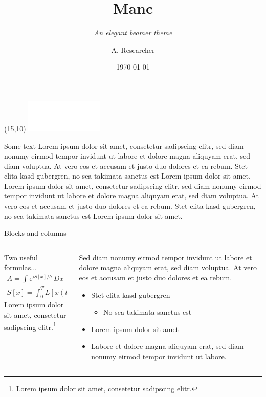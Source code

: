\documentclass[compress,aspectratio=1610]{beamer}
\title{Manc}
\subtitle{\textit{An elegant beamer theme}}
\date{\today}
\author{A. Researcher}
\institute{\texttt{mymail@myuniversity.edu}}
\begin{document}
\begin{frame}
  \titlepage
  \begin{textblock}{1}(15,10)
    \includegraphics[width=10em]{./graphics/manchester.pdf}
  \end{textblock}
\end{frame}

\begin{frame}{Some text}
	Lorem ipsum dolor sit amet, consetetur sadipscing elitr, sed diam nonumy eirmod tempor invidunt ut labore et dolore magna aliquyam erat, sed diam voluptua. At vero eos et accusam et justo duo dolores et ea rebum. Stet clita kasd gubergren, no sea takimata sanctus est Lorem ipsum dolor sit amet. Lorem  ipsum dolor sit amet, consetetur sadipscing elitr, sed diam nonumy eirmod tempor invidunt ut labore et dolore magna aliquyam erat, sed diam voluptua. At vero eos et accusam et justo duo dolores et ea rebum. Stet clita kasd gubergren, no sea takimata sanctus est Lorem ipsum dolor sit amet.
\end{frame}

\begin{frame}{Blocks and columns}
  \begin{columns}
    \begin{column}{0.5\textwidth}
      \begin{block}{Two useful formulas...}
        \begin{gather*}
          A = \int^{}\mathrm{e}^{\mathrm{i} S[x] / \hbar}\,Dx \\
          S[x] = \int^{T}_0 L[x(t)]\,\mathrm{d}t
        \end{gather*}
      Lorem ipsum dolor sit amet, consetetur sadipscing elitr.\footnote[frame]{Lorem ipsum dolor sit amet, consetetur sadipscing elitr.}
      \end{block}
    \end{column}
    \begin{column}{0.5\textwidth}
      Sed diam nonumy eirmod tempor invidunt ut labore et dolore magna aliquyam erat, sed diam voluptua. At vero eos et accusam et justo duo dolores et ea rebum.

      \begin{itemize}
        \item Stet clita kasd gubergren
          \begin{itemize}
            \item No sea takimata sanctus est
          \end{itemize}
        \item Lorem ipsum dolor sit amet
        \item Labore et dolore magna aliquyam erat, sed diam nonumy eirmod tempor invidunt ut labore.
      \end{itemize}
    \end{column}
  \end{columns}
\end{frame}
\end{document}
